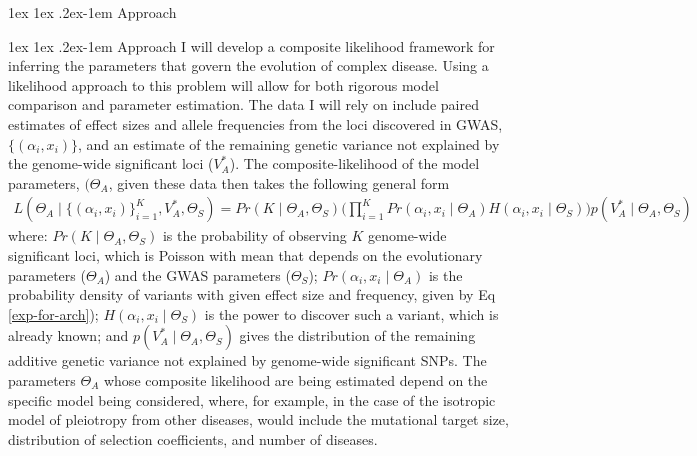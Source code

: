 \message{ !name(ResearchStrategy.tex)}\documentclass[11pt]{article}
\makeatletter
\renewcommand{\paragraph}{%
  \@startsection{paragraph}{4}%
  {\z@}{1ex \@plus 1ex \@minus .2ex}{-1em}%
  {\normalfont\normalsize\bfseries}%
}
\makeatother
\begin{document}
\paragraph{Approach}


\paragraph{Approach}
I will develop a composite likelihood framework for inferring the parameters that govern the evolution of complex disease. Using a likelihood approach to this problem will allow for both rigorous model comparison and parameter estimation\cite{Larribe:2011jb,Coffman:2015by}. The data I will rely on include paired estimates of effect sizes and allele frequencies from the loci discovered in GWAS, $\{\left(\alpha_i, x_i\right)\}$, and an estimate of the remaining genetic variance not explained by the genome-wide significant loci ($ V^*_A$). The composite-likelihood of the model parameters, $(\Theta_A$, given these data then takes the following general form
 \begin{align*}
L\left(\Theta_A \mid \{\left(\alpha_i, x_i\right)\}_{i=1}^K , V^*_A, \Theta_S\right) 
= Pr\left(K \mid \Theta_A , \Theta_S \right) \Bigg( \prod_{i=1}^K Pr\left(\alpha_i , x_i \mid \Theta_A \right) H\left(\alpha_i , x_i \mid \Theta_S\right) \Bigg) p\left(V^*_A \mid \Theta_A, \Theta_S \right)
\end{align*}
where: $ Pr\left(K \mid \Theta_A , \Theta_S \right)$ is the probability of observing $K$ genome-wide significant loci, which is Poisson with mean that depends on the evolutionary parameters ($\Theta_A$)  and the GWAS parameters ($\Theta_S$); $Pr\left(\alpha_i , x_i \mid \Theta_A \right)$ is the probability density of variants with given effect size and frequency, given by Eq \eqref{exp-for-arch}); $H\left(\alpha_i , x_i \mid \Theta_S\right)$ is the power to discover such a variant, which is already known\cite{Sham:2014di}; and $p\left(V_A^* \mid \Theta_A , \Theta_S\right)$ gives the distribution of the remaining additive genetic variance not explained by genome-wide significant SNPs. The parameters $\Theta_A$ whose composite likelihood are being estimated depend on the specific model being considered, where, for example, in the case of the isotropic model of pleiotropy from other diseases, would include the mutational target size, distribution of selection coefficients, and number of diseases.
\end{document}
